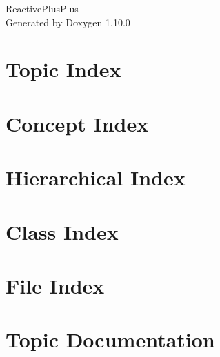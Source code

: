 \documentclass[twoside]{book}
\newcommand{\+}{\discretionary{\mbox{\scriptsize$\hookleftarrow$}}{}{}}
\newcommand{\clearemptydoublepage}{%
    \newpage{\pagestyle{empty}\cleardoublepage}%
  }
\begin{document}
  \raggedbottom
    \hypersetup{pageanchor=false,
                bookmarksnumbered=true,
                pdfencoding=unicode
               }
  \begin{titlepage}
  \vspace*{7cm}
  \begin{center}%
  {\Large Reactive\+Plus\+Plus}\\
  \vspace*{1cm}
  {\large Generated by Doxygen 1.10.0}\\
  \end{center}
  \end{titlepage}
  \clearemptydoublepage
  \tableofcontents
  \clearemptydoublepage
  \hypersetup{pageanchor=true}

\chapter{Topic Index}

\chapter{Concept Index}

\chapter{Hierarchical Index}

\chapter{Class Index}

\chapter{File Index}

\chapter{Topic Documentation}


\end{document}
